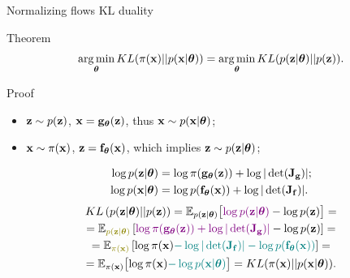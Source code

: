 \documentclass{beamer}
\begin{document}
\begin{frame}{Normalizing flows KL duality}
	\begin{block}{Theorem}
		\vspace{-0.3cm}
		\[
			\operatorname*{arg\,min}_{\boldsymbol{\theta}} KL(\pi(\mathbf{x}) || p(\mathbf{x} | \boldsymbol{\theta})) = \operatorname*{arg\,min}_{\boldsymbol{\theta}} KL(p(\mathbf{z} | \boldsymbol{\theta}) || p(\mathbf{z})).
		\]
		\vspace{-0.5cm}
	\end{block}
	\begin{block}{Proof}
		\begin{itemize}
			\item $\mathbf{z} \sim p(\mathbf{z})$, $\mathbf{x} = \mathbf{g}_{\boldsymbol{\theta}}(\mathbf{z})$, thus $\mathbf{x} \sim p(\mathbf{x}| \boldsymbol{\theta})$;
			\item $\mathbf{x} \sim \pi(\mathbf{x})$, $\mathbf{z} = \mathbf{f}_{\boldsymbol{\theta}}(\mathbf{x})$, which implies $\mathbf{z} \sim p(\mathbf{z} | \boldsymbol{\theta})$;
		\end{itemize}
		\vspace{-0.3cm}
		\begin{align*}
			\log p(\mathbf{z} | \boldsymbol{\theta}) &= \log \pi(\mathbf{g}_{\boldsymbol{\theta}}(\mathbf{z})) + \log | \det ( \mathbf{J}_{\mathbf{g}}) |; \\
			\log p(\mathbf{x} | \boldsymbol{\theta}) &= \log p(\mathbf{f}_{\boldsymbol{\theta}}(\mathbf{x})) + \log | \det ( \mathbf{J}_{\mathbf{f}}) |.
		\end{align*}
		\vspace{-0.9cm}
		\begin{multline*}
			KL\left(p(\bz | \btheta) || p(\bz) \right) = \mathbb{E}_{p(\bz | \btheta)} \bigl[ {\color{violet}\log p(\bz | \btheta)} - \log p(\bz) \bigr] = \\ 
			= \mathbb{E}_{{\color{olive}p(\bz | \btheta)}} \left[ {\color{violet}\log \pi(\bg_{\btheta}(\bz)) +  \log |\det (\bJ_\bg)|} - \log p(\bz) \right] = \\
			= \mathbb{E}_{{\color{olive}\pi(\bx)}} \left[ \log \pi(\bx) {\color{teal} - \log |\det (\bJ_\bff)| - \log p(\bff_{\btheta}(\bx))} \right] = \\
			= \mathbb{E}_{\pi(\bx)} \bigl[ \log \pi(\bx) {\color{teal} -\log p(\bx | \btheta)} \bigr] = KL (\pi(\bx) || p(\bx | \btheta)).
		\end{multline*}
	\end{block}
\end{frame}
\end{document}
